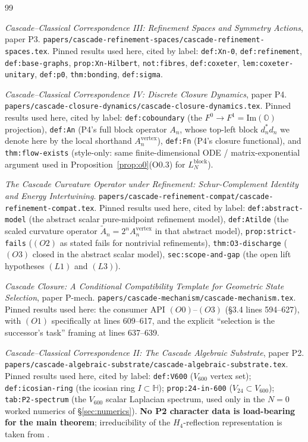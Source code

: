 \documentclass[11pt]{article}
\newcommand{\HH}{\mathbb{H}}
\newcommand{\OO}{\mathbb{O}}
\theoremstyle{definition}
\begin{document}
\begin{thebibliography}{99}

\emph{Cascade--Classical Correspondence III: Refinement Spaces and
Symmetry Actions}, paper P3.
\texttt{papers/cascade-refinement-spaces/cascade-refinement-spaces.tex}.
Pinned results used here, cited by label:
\texttt{def:Xn-0}, \texttt{def:refinement}, \texttt{def:base-graphs},
\texttt{prop:Xn-Hilbert}, \texttt{not:fibres},
\texttt{def:coxeter}, \texttt{lem:coxeter-unitary},
\texttt{def:p0}, \texttt{thm:bonding}, \texttt{def:sigma}.

\emph{Cascade--Classical Correspondence IV: Discrete Closure
Dynamics}, paper P4.
\texttt{papers/cascade-closure-dynamics/cascade-closure-dynamics.tex}.
Pinned results used here, cited by label:
\texttt{def:coboundary} (the $F^0 \to F^1 = \mathrm{Im}(\OO)$
projection), \texttt{def:An} (P4's full block operator $A_n$,
whose top-left block $d_n^{*} d_n$ we denote here by the local
shorthand $A_n^{\mathrm{vertex}}$),
\texttt{def:Fn} (P4's closure functional), and
\texttt{thm:flow-exists} (style-only: same finite-dimensional ODE /
matrix-exponential argument used in
Proposition~\ref{prop:o0}(O0.3) for $L_N^{\mathrm{block}}$).

\emph{The Cascade Curvature Operator under Refinement:
Schur-Complement Identity and Energy Intertwining}.
\texttt{papers/cascade-refinement-compat/cascade-refinement-compat.tex}.
Pinned results used here, cited by label:
\texttt{def:abstract-model} (the abstract scalar pure-midpoint
refinement model), \texttt{def:Atilde} (the scaled curvature
operator $\widetilde A_n = 2^n A_n^{\mathrm{vertex}}$ in that
abstract model), \texttt{prop:strict-fails} ($(O2)$ as stated
fails for nontrivial refinements),
\texttt{thm:O3-discharge} ($(O3)$ closed in the abstract scalar
model), \texttt{sec:scope-and-gap} (the open lift hypotheses
$(L1)$ and $(L3)$).

\emph{Cascade Closure: A Conditional Compatibility Template for
Geometric State Selection}, paper P-mech.
\texttt{papers/cascade-mechanism/cascade-mechanism.tex}.
Pinned results used here: the consumer API $(O0)$--$(O3)$
(\S 3.4 lines 594--627), with $(O1)$ specifically at lines
609--617, and the explicit ``selection is the successor's task''
framing at lines 637--639.

\emph{Cascade--Classical Correspondence II: The Cascade Algebraic
Substrate}, paper P2.
\texttt{papers/cascade-algebraic-substrate/cascade-algebraic-substrate.tex}.
Pinned results used here, cited by label:
\texttt{def:V600} ($V_{600}$ vertex set);
\texttt{def:icosian-ring} (the icosian ring $I \subset \HH$);
\texttt{prop:24-in-600} ($V_{24} \subset V_{600}$);
\texttt{tab:P2-spectrum} (the $V_{600}$ scalar Laplacian
spectrum, used only in the $N = 0$ worked numerics of
\S\ref{sec:numerics}). \textbf{No P2 character data is
load-bearing for the main theorem}; irreducibility of the
$H_4$-reflection representation is taken from \cite{Humphreys}.


\end{thebibliography}
\end{document}

